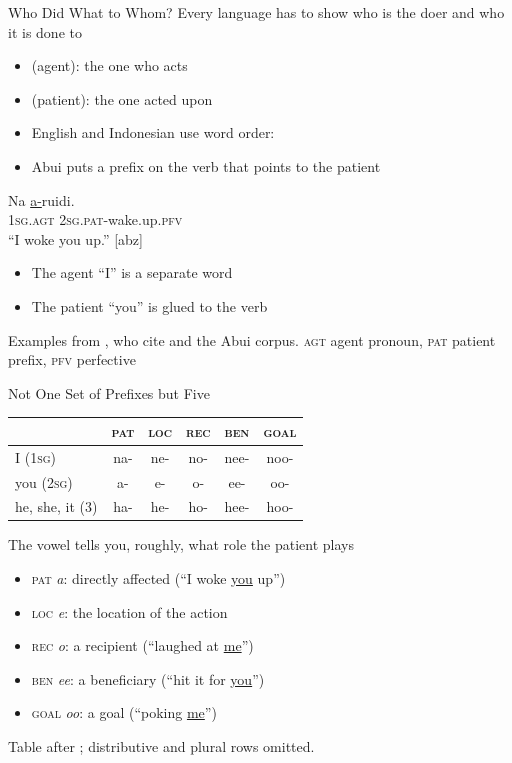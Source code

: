 \documentclass{beamer}
\begin{document}
\begin{frame}{Who Did What to Whom?}
  Every language has to show who is the doer and who it is done to
  \begin{itemize}
  \item {} (agent): the one who acts
  \item {} (patient): the one acted upon
  \item English and Indonesian use word order: 
  \item Abui puts a prefix on the verb that points to the patient
  \end{itemize}
  \begin{exe}
    \ex
    \gll Na \ul{a-}ruidi. \\
         1\textsc{sg.agt} 2\textsc{sg.pat}-wake.up.\textsc{pfv} \\
    \trans ``I woke you up.'' [abz]
  \end{exe}
  \begin{itemize}
  \item The agent  ``I'' is a separate word
  \item The patient  ``you'' is glued to the verb
  \end{itemize}
  \vfill
  \footnotesize
  Examples from \citet{klamer:kratochvil:2018}, who cite \citet{kratochvil:2007,kratochvil:2014}
  and the Abui corpus.
  \textsc{agt} agent pronoun, \textsc{pat} patient prefix, \textsc{pfv} perfective
\end{frame}

\begin{frame}{Not One Set of Prefixes but Five}
  \begin{center}
    \begin{tabular}{lccccc}
      \toprule
      & \textsc{pat} & \textsc{loc} & \textsc{rec} & \textsc{ben} & \textsc{goal} \\
      \midrule
      I (1\textsc{sg})   & na- & ne- & no- & nee- & noo- \\
      you (2\textsc{sg}) & a-  & e-  & o-  & ee-  & oo-  \\
      he, she, it (3)    & ha- & he- & ho- & hee- & hoo- \\
      \bottomrule
    \end{tabular}
  \end{center}
  \vfill
  The vowel tells you, roughly, what role the patient plays
  \begin{itemize}
  \item \textsc{pat} \emph{a}: directly affected (``I woke \ul{you} up'')
  \item \textsc{loc} \emph{e}: the location of the action
  \item \textsc{rec} \emph{o}: a recipient (``laughed at \ul{me}'')
  \item \textsc{ben} \emph{ee}: a beneficiary (``hit it for \ul{you}'')
  \item \textsc{goal} \emph{oo}: a goal (``poking \ul{me}'')
  \end{itemize}
  \vfill
  \footnotesize
  Table after \citet[Table 5]{klamer:kratochvil:2018}; distributive and plural rows omitted.
\end{frame}
\end{document}
